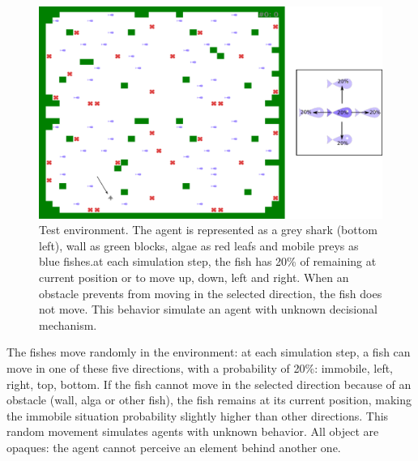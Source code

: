 \documentclass[conference]{IEEEtran}
\begin{document}
\begin{figure}[htbp]
\centerline{\includegraphics[scale=0.35]{img/environment.pdf}}
\caption{Test environment. The agent is represented as a grey shark (bottom left), wall as green blocks, algae as red leafs and mobile preys as blue fishes.at each simulation step, the fish has 20\% of remaining at current position or to move up, down, left and right. When an obstacle prevents from moving in the selected direction, the fish does not move. This behavior simulate an agent with unknown decisional mechanism.}
\label{fig}
\end{figure}

The fishes move randomly in the environment: at each simulation step, a fish can move in one of these five directions, with a probability of 20\%: immobile, left, right, top, bottom. If the fish cannot move in the selected direction because of an obstacle (wall, alga or other fish), the fish remains at its current position, making the immobile situation probability slightly higher than other directions. This random movement simulates agents with unknown behavior. All object are opaques: the agent cannot perceive an element behind another one.
\end{document}
